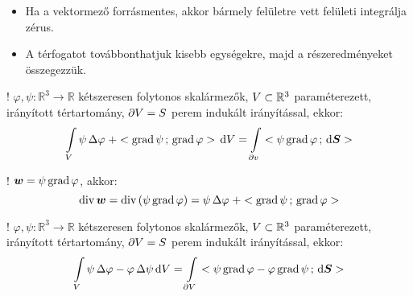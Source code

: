 \documentclass[main.tex]{subfiles}
\begin{document}
\begin{itemize}
  \item Ha a vektormező forrásmentes, akkor bármely
        felületre vett felületi integrálja zérus.

  \item A térfogatot továbbonthatjuk kisebb egységekre,
        majd a részeredményeket összegezzük.
\end{itemize}




! $\varphi, \psi : \mathbb{R}^3 \rightarrow \mathbb{R}$
kétszeresen folytonos skalármezők, ${V} \subset \mathbb{R}^3$
paraméterezett, irányított tértartomány,
$\partial {V} = {S}$
perem indukált irányítással, ekkor:
\begin{equation*}
  \int \limits_{{V}}
  \psi \, \Delta \varphi \; + < \operatorname{grad} \psi \, ; \, \operatorname{grad} \varphi >
  \, \mathrm{d} {V}
  =
  \int \limits_{\partial {v}}
  < \psi \operatorname{grad} \varphi \, ; \, \mathrm{d} \boldsymbol{S} >
\end{equation*}




! $\boldsymbol{w} = \psi \operatorname{grad} \varphi$, akkor:
\begin{equation*}
  \operatorname{div} \boldsymbol{w}
  =
  \operatorname{div} \left(
  \psi \operatorname{grad} \varphi
  \right)
  =
  \psi \, \Delta \varphi \; + < \operatorname{grad} \psi \, ; \, \operatorname{grad} \varphi >
\end{equation*}



! $\varphi, \psi : \mathbb{R}^3 \rightarrow \mathbb{R}$
kétszeresen folytonos skalármezők, ${V} \subset \mathbb{R}^3$
paraméterezett, irányított tértartomány,
$\partial {V} = {S}$
perem indukált irányítással, ekkor:
\begin{equation*}
  \int \limits_{{V}}
  \psi \, \Delta \varphi - \varphi \, \Delta \psi
  \, \mathrm{d} {V}
  =
  \int \limits_{\partial {V}}
  < 
    \psi \operatorname{grad} \varphi - \varphi \operatorname{grad} \psi
   \, ; \, \mathrm{d} \boldsymbol{S} >
\end{equation*}
\end{document}
